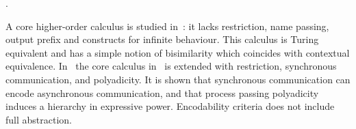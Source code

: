 . %

A core higher-order calculus is studied in~\cite{DBLP:journals/iandc/LanesePSS11}: 
it lacks restriction,  name passing, output prefix %
and constructs for infinite behaviour. 
This calculus is Turing equivalent and has 
a simple notion of bisimilarity which coincides with 
contextual equivalence.
In~\cite{DBLP:conf/icalp/LanesePSS10}
the core calculus in~\cite{DBLP:journals/iandc/LanesePSS11} is extended with restriction,
synchronous communication, and polyadicity. It is shown that 
synchronous communication can encode asynchronous communication, %
and that process passing polyadicity induces a hierarchy in expressive power.
Encodability criteria does not include full abstraction.

